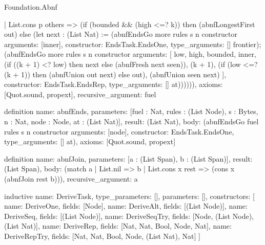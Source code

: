 \begin{lexlean}{Foundation.Abnf}
\begin{semanticmodule}
{        | List.cons p others => (if (bounded && (high <=? k)) then (abnfLongestFirst out) else (let next : (List Nat) := (abnfEndsGo more rules s n constructor{
          arguments: [inner],
          constructor: EndsTask.EndsOne,
          type_arguments: []
        } frontier); (abnfEndsGo more rules s n constructor{
          arguments: [
            low,
            high,
            bounded,
            inner,
            (if ((k + 1) <? low) then next else (abnfFresh next seen)),
            (k + 1),
            (if (low <=? (k + 1)) then (abnfUnion out next) else out),
            (abnfUnion seen next)
          ],
          constructor: EndsTask.EndsRep,
          type_arguments: []
        } at)))))),
  axioms: [Quot.sound, propext],
  recursive_argument: fuel
}

definition{
  name: abnfEnds,
  parameters: [fuel : Nat, rules : (List Node), s : Bytes, n : Nat, node : Node, at : (List Nat)],
  result: (List Nat),
  body: (abnfEndsGo fuel rules s n constructor{
    arguments: [node],
    constructor: EndsTask.EndsOne,
    type_arguments: []
  } at),
  axioms: [Quot.sound, propext]
}

definition{
  name: abnfJoin,
  parameters: [a : (List Span), b : (List Span)],
  result: (List Span),
  body: (match a | List.nil => b | List.cons x rest => (cons x (abnfJoin rest b))),
  recursive_argument: a
}

inductive{
  name: DeriveTask,
  type_parameters: [],
  parameters: [],
  constructors: [
    {name: DeriveOne, fields: [Node]},
    {name: DeriveAlt, fields: [(List Node)]},
    {name: DeriveSeq, fields: [(List Node)]},
    {name: DeriveSeqTry, fields: [Node, (List Node), (List Nat)]},
    {name: DeriveRep, fields: [Nat, Nat, Bool, Node, Nat]},
    {name: DeriveRepTry, fields: [Nat, Nat, Bool, Node, (List Nat), Nat]}
  ]
}


\end{semanticmodule}
\end{lexlean}
